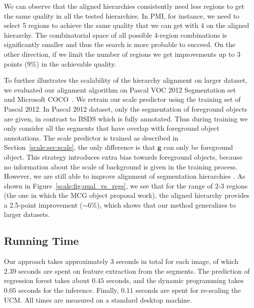 We can observe that the aligned hierarchies consistently need less
regions to get the same quality in all the tested hierarchies.  In
PMI, for instance, we need to select 5 regions to achieve the same
quality that we can get with 4 on the aligned hierarchy. The
combinatorial space of all possible 4-region combinations is
significantly smaller and thus the search is more probable to
succeed. On the other direction, if we limit the number of regions we
get improvements up to 3 points (9\%) in the achievable quality.

To further illustrates the scalability of the hierarchy alignment on larger dataset, we evaluated our alignment algorithm on Pascal VOC 2012 Segmentation set~\citep{everingham2010pascal} and Microsoft COCO~\citep{lin2014microsoft}. We retrain our scale predictor using the training set of Pascal 2012. In Pascal 2012 dataset, only the segmentation of foreground objects are given, in contrast to BSDS which is fully annotated. Thus during training we only consider all the segments that have overlap with foreground object annotations. The scale predictor is trained as described in Section~\ref{scale:sec:scale}, the only difference is that $\mathbf{g}$ can only be foreground object. This strategy introduces extra bias towards foreground objects, because no information about the scale of background is given in the training process. However, we are still able to improve alignment of segmentation hierarchies . As shown in Figure~\ref{scale:fig:qual_vs_regs}, we see that for the range of 2-3 regions (the one in which the MCG object proposal work), the aligned hierarchy provides a 2.5-point improvement ($\sim$6\%), which shows that our method generalizes to larger datasets. 

\subsection{Running Time}
Our approach takes approximately 3 seconds in total for each image, of which $2.39$
seconds are spent on feature extraction from the segments. The prediction
of regression forest takes about $0.45$ seconds, and the dynamic
programming takes $0.05$ seconds for the inference. Finally, $0.11$
seconds are spent for re-scaling the UCM.
All times are measured on a standard desktop machine.



